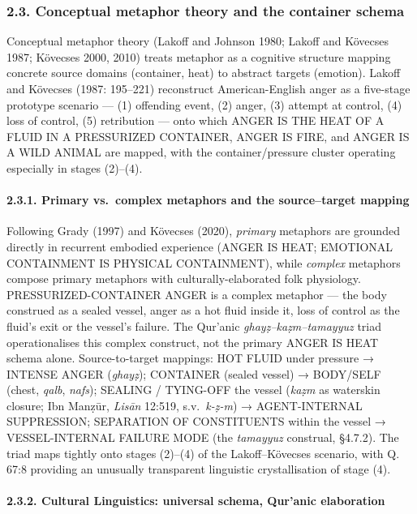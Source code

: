 \documentclass[11pt,a4paper]{article}
\begin{document}
\subsubsection{2.3. Conceptual metaphor theory and the container
schema}\label{conceptual-metaphor-theory-and-the-container-schema}

Conceptual metaphor theory (Lakoff and Johnson 1980; Lakoff and Kövecses
1987; Kövecses 2000, 2010) treats metaphor as a cognitive structure
mapping concrete source domains (container, heat) to abstract targets
(emotion). Lakoff and Kövecses (1987: 195--221) reconstruct
American-English anger as a five-stage prototype scenario --- (1)
offending event, (2) anger, (3) attempt at control, (4) loss of control,
(5) retribution --- onto which ANGER IS THE HEAT OF A FLUID IN A
PRESSURIZED CONTAINER, ANGER IS FIRE, and ANGER IS A WILD ANIMAL are
mapped, with the container/pressure cluster operating especially in
stages (2)--(4).

\paragraph{2.3.1. Primary vs.~complex metaphors and the source--target
mapping}\label{primary-vs.-complex-metaphors-and-the-sourcetarget-mapping}

Following Grady (1997) and Kövecses (2020), \emph{primary} metaphors are
grounded directly in recurrent embodied experience (ANGER IS HEAT;
EMOTIONAL CONTAINMENT IS PHYSICAL CONTAINMENT), while \emph{complex}
metaphors compose primary metaphors with culturally-elaborated folk
physiology. PRESSURIZED-CONTAINER ANGER is a complex metaphor --- the
body construed as a sealed vessel, anger as a hot fluid inside it, loss
of control as the fluid's exit or the vessel's failure. The Qur'anic
\emph{ghayẓ--kaẓm--tamayyuz} triad operationalises this complex
construct, not the primary ANGER IS HEAT schema alone. Source-to-target
mappings: HOT FLUID under pressure → INTENSE ANGER (\emph{ghayẓ});
CONTAINER (sealed vessel) → BODY/SELF (chest, \emph{qalb}, \emph{nafs});
SEALING / TYING-OFF the vessel (\emph{kaẓm} as waterskin closure; Ibn
Manẓūr, \emph{Lisān} 12:519, s.v.~\emph{k-ẓ-m}) → AGENT-INTERNAL
SUPPRESSION; SEPARATION OF CONSTITUENTS within the vessel →
VESSEL-INTERNAL FAILURE MODE (the \emph{tamayyuz} construal, §4.7.2).
The triad maps tightly onto stages (2)--(4) of the Lakoff--Kövecses
scenario, with Q. 67:8 providing an unusually transparent linguistic
crystallisation of stage (4).

\paragraph{2.3.2. Cultural Linguistics: universal schema, Qur'anic
elaboration}\label{cultural-linguistics-universal-schema-quranic-elaboration}
\end{document}

